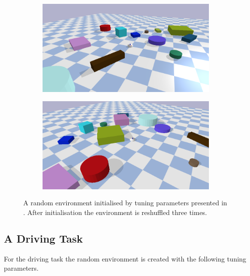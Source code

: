 \begin{figure}[H]
    \vspace{0.2cm}
    \begin{subfigure}{.49\textwidth}
    \includegraphics[width=\textwidth]{figures/results/random3}
    \end{subfigure}
    \hfill
    \begin{subfigure}{.49\textwidth}
    \centering
    \includegraphics[width=\textwidth]{figures/results/random4}
    \end{subfigure}
    \caption{A random environment initialised by tuning parameters presented in . After initialisation the environment is reshuffled three times.}%
    \label{fig:random_environment_reshuffle}
\end{figure}

\subsection{A Driving Task}%
\label{subsec:rand_driving}
For the driving task the random environment is created with the following tuning parameters.\bs

